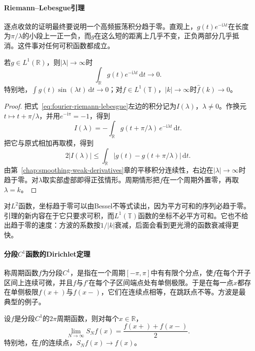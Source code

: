 \paragraph{Riemann--Lebesgue引理}

逐点收敛的证明最终要说明一个高频振荡积分趋于零。直观上，$g(t)e^{-\mathrm i\lambda t}$在长度为$\pi/\lambda$的小段上一正一负，而$g$在这么短的距离上几乎不变，正负两部分几乎抵消。这件事对任何可积函数都成立。

\begin{lemma}
\label{lem:fourier-riemann-lebesgue}
若$g\in L^1(\mathbb R)$，则$\lvert\lambda\rvert\to\infty$时
\begin{equation}
\int_{\mathbb R}g(t)e^{-\mathrm i\lambda t}\,\mathrm dt\to0 .
\label{eq:fourier-riemann-lebesgue}
\end{equation}
特别地，$\int g(t)\sin(\lambda t)\,\mathrm dt\to0$；对$f\in L^1(\mathbb T)$，$\lvert k\rvert\to\infty$时$\widehat f(k)\to0$。
\end{lemma}

\begin{proof}
把式~\eqref{eq:fourier-riemann-lebesgue}左边的积分记为$I(\lambda)$，$\lambda\neq0$。作换元$t\mapsto t+\pi/\lambda$，并用$e^{-\mathrm i\pi}=-1$，得到
\[
I(\lambda)=-\int_{\mathbb R}g(t+\pi/\lambda)\,e^{-\mathrm i\lambda t}\,\mathrm dt.
\]
把它与原式相加再取模，得到
\[
2\lvert I(\lambda)\rvert\leq\int_{\mathbb R}\lvert g(t)-g(t+\pi/\lambda)\rvert\,\mathrm dt.
\]
由第~\ref{chap:smoothing-weak-derivatives}章的平移积分连续性，右边在$\lvert\lambda\rvert\to\infty$时趋于零。对$\lambda$取实部虚部即得正弦情形。周期情形把$f$在一个周期外置零，再取$\lambda=k$。
\end{proof}

对$L^2$函数，坐标趋于零可以由Bessel不等式读出，因为平方可和的序列必趋于零。引理的新内容在于它只要求可积，而$L^1(\mathbb T)$函数的坐标不必平方可和。它也不给出趋于零的速度：方波的系数按$1/\lvert k\rvert$衰减，后面会看到更光滑的函数衰减得更快。

\paragraph{分段$C^1$函数的Dirichlet定理}

称周期函数$f$为分段$C^1$，是指在一个周期$[-\pi,\pi]$中有有限个分点，使$f$在每个开子区间上连续可微，并且$f$与$f'$在每个子区间端点处有单侧极限。于是在每一点$x$都存在单侧极限$f(x+)$与$f(x-)$，它们在连续点相等，在跳跃点不等。方波是最典型的例子。

\begin{theorem}[Dirichlet定理]
\label{thm:fourier-dirichlet}
设$f$是分段$C^1$的$2\pi$周期函数，则对每个$x\in\mathbb R$，
\begin{equation}
\lim_{N\to\infty}S_Nf(x)=\frac{f(x+)+f(x-)}2 .
\label{eq:fourier-dirichlet-limit}
\end{equation}
特别地，在$f$的连续点，$S_Nf(x)\to f(x)$。
\end{theorem}

